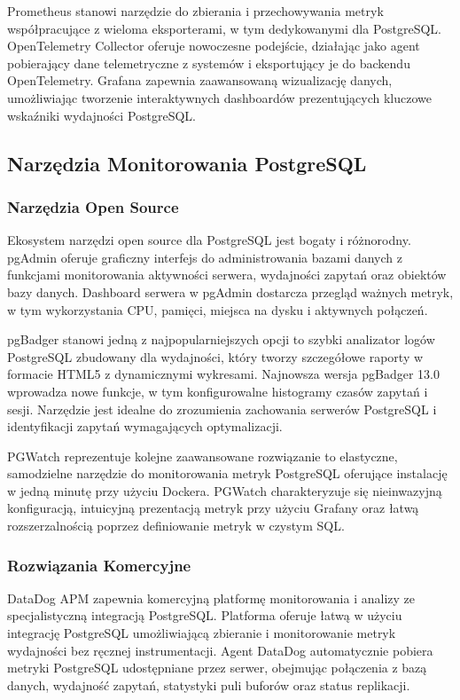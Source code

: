 \documentclass[letterpaper,10pt,polish]{sphinxmanual}
\begin{document}
\sphinxAtStartPar
Prometheus stanowi narzędzie do zbierania i przechowywania metryk współpracujące z wieloma eksporterami, w tym dedykowanymi dla PostgreSQL. OpenTelemetry Collector oferuje nowoczesne podejście, działając jako agent pobierający dane telemetryczne z systemów i eksportujący je do backendu OpenTelemetry. Grafana zapewnia zaawansowaną wizualizację danych, umożliwiając tworzenie interaktywnych dashboardów prezentujących kluczowe wskaźniki wydajności PostgreSQL.


\subsection{Narzędzia Monitorowania PostgreSQL}
\label{\detokenize{rozdzial2/repo-wspolne/index:narzedzia-monitorowania-postgresql}}

\subsubsection{Narzędzia Open Source}
\label{\detokenize{rozdzial2/repo-wspolne/index:narzedzia-open-source}}
\sphinxAtStartPar
Ekosystem narzędzi open source dla PostgreSQL jest bogaty i różnorodny. pgAdmin oferuje graficzny interfejs do administrowania bazami danych z funkcjami monitorowania aktywności serwera, wydajności zapytań oraz obiektów bazy danych. Dashboard serwera w pgAdmin dostarcza przegląd ważnych metryk, w tym wykorzystania CPU, pamięci, miejsca na dysku i aktywnych połączeń.

\sphinxAtStartPar
pgBadger stanowi jedną z najpopularniejszych opcji \sphinxhyphen{} to szybki analizator logów PostgreSQL zbudowany dla wydajności, który tworzy szczegółowe raporty w formacie HTML5 z dynamicznymi wykresami. Najnowsza wersja pgBadger 13.0 wprowadza nowe funkcje, w tym konfigurowalne histogramy czasów zapytań i sesji. Narzędzie jest idealne do zrozumienia zachowania serwerów PostgreSQL i identyfikacji zapytań wymagających optymalizacji.

\sphinxAtStartPar
PGWatch reprezentuje kolejne zaawansowane rozwiązanie \sphinxhyphen{} to elastyczne, samodzielne narzędzie do monitorowania metryk PostgreSQL oferujące instalację w jedną minutę przy użyciu Dockera. PGWatch charakteryzuje się nieinwazyjną konfiguracją, intuicyjną prezentacją metryk przy użyciu Grafany oraz łatwą rozszerzalnością poprzez definiowanie metryk w czystym SQL.


\subsubsection{Rozwiązania Komercyjne}
\label{\detokenize{rozdzial2/repo-wspolne/index:rozwiazania-komercyjne}}
\sphinxAtStartPar
DataDog APM zapewnia komercyjną platformę monitorowania i analizy ze specjalistyczną integracją PostgreSQL. Platforma oferuje łatwą w użyciu integrację PostgreSQL umożliwiającą zbieranie i monitorowanie metryk wydajności bez ręcznej instrumentacji. Agent DataDog automatycznie pobiera metryki PostgreSQL udostępniane przez serwer, obejmując połączenia z bazą danych, wydajność zapytań, statystyki puli buforów oraz status replikacji.
\end{document}
